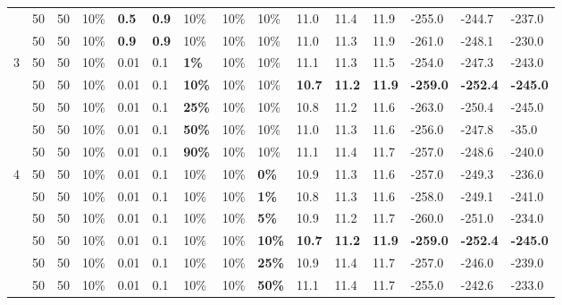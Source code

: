 \begin{table}
\begin{tabular}{|l|l|l|l|l|l|l|l|l||l|l|l|l|l|l|}
    ~ & 50 & 50 & 10\% & \textbf{0.5} & \textbf{0.9} & 10\% & 10\% & 10\% & 11.0 & 11.4 & 11.9 & -255.0 & -244.7 & -237.0 \\
    ~ & 50 & 50 & 10\% & \textbf{0.9} & \textbf{0.9} & 10\% & 10\% & 10\% & 11.0 & 11.3 & 11.9 & -261.0 & -248.1 & -230.0 \\
    \hline
    3 & 50 & 50 & 10\% & 0.01 & 0.1 & \textbf{1\%} & 10\% & 10\% & 11.1 & 11.3 & 11.5 & -254.0 & -247.3 & -243.0 \\
    ~ & 50 & 50 & 10\% & 0.01 & 0.1 & \textbf{10\%} & 10\% & 10\% & \textbf{10.7} & \textbf{11.2} & \textbf{11.9} & \textbf{-259.0} & \textbf{-252.4} & \textbf{-245.0} \\
    ~ & 50 & 50 & 10\% & 0.01 & 0.1 & \textbf{25\%} & 10\% & 10\% & 10.8 & 11.2 & 11.6 & -263.0 & -250.4 & -245.0 \\
    ~ & 50 & 50 & 10\% & 0.01 & 0.1 & \textbf{50\%} & 10\% & 10\% & 11.0 & 11.3 & 11.6 & -256.0 & -247.8 & -35.0 \\
    ~ & 50 & 50 & 10\% & 0.01 & 0.1 & \textbf{90\%} & 10\% & 10\% & 11.1 & 11.4 & 11.7 & -257.0 & -248.6 & -240.0 \\
    \hline
    4 & 50 & 50 & 10\% & 0.01 & 0.1 & 10\% & 10\% & \textbf{0\%} & 10.9 & 11.3 & 11.6 & -257.0 & -249.3 & -236.0 \\
    ~ & 50 & 50 & 10\% & 0.01 & 0.1 & 10\% & 10\% & \textbf{1\%} & 10.8 & 11.3 & 11.6 & -258.0 & -249.1 & -241.0 \\
    ~ & 50 & 50 & 10\% & 0.01 & 0.1 & 10\% & 10\% & \textbf{5\%} &  10.9 & 11.2 & 11.7 & -260.0 & -251.0 & -234.0 \\
    ~ & 50 & 50 & 10\% & 0.01 & 0.1 & 10\% & 10\% & \textbf{10\%} & \textbf{10.7} & \textbf{11.2} & \textbf{11.9} & \textbf{-259.0} & \textbf{-252.4} & \textbf{-245.0} \\
    ~ & 50 & 50 & 10\% & 0.01 & 0.1 & 10\% & 10\% & \textbf{25\%} & 10.9 & 11.4 & 11.7 & -257.0 & -246.0 & -239.0 \\
    ~ & 50 & 50 & 10\% & 0.01 & 0.1 & 10\% & 10\% & \textbf{50\%} & 11.1 & 11.4 & 11.7 & -255.0 & -242.6 & -233.0 \\

\end{tabular}
\end{table}
